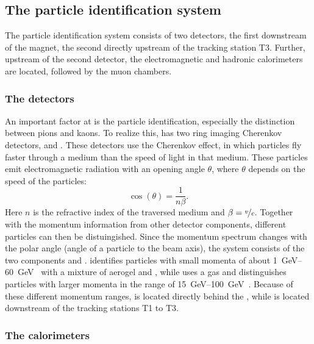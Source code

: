 \subsection{The particle identification system}
\label{sec:PartID}

The particle identification system consists of two \rich detectors, the first downstream of the magnet, the second directly upstream of the tracking station T3.
Further, upstream of the second \rich detector, the electromagnetic and hadronic calorimeters are located, followed by the muon chambers.

\subsubsection*{The \rich detectors}
\label{sec:rich}

An important factor at \lhcb is the particle identification, especially the distinction between pions and kaons.
To realize this, \lhcb has two ring imaging Cherenkov detectors, \richone and \richtwo.
These detectors use the Cherenkov effect, in which particles fly faster through a medium than the speed of light in that medium.
These particles emit electromagnetic radiation with an opening angle $\theta$, where $\theta$ depends on the speed of the particles:
\begin{equation}
\cos\!\left(\theta\right) = \frac{1}{n\beta}.
\end{equation}
Here $n$ is the refractive index of the traversed medium and $\beta = \nicefrac{v}{c}$.
Together with the momentum information from other detector components, different particles can then be distuingished.
Since the momentum spectrum changes with the polar angle (angle of a particle to the beam axis), the \rich system consists of the two components \richone and \richtwo.
\richone identifies particles with small momenta of about \SIrange{1}{60}{\giga\electronvolt}~\cite{Alves:2008zz} with a mixture of aerogel and \cfourften, while \richtwo uses a \cffour gas and distinguishes particles with larger momenta in the range of \SIrange{15}{100}{\giga\electronvolt}~\cite{Alves:2008zz}. Because of these different momentum ranges, \richone is located directly behind the \velo, while \richtwo is located downstream of the tracking stations T1 to T3.

\subsubsection*{The calorimeters}
\label{sec:calorimeters}

